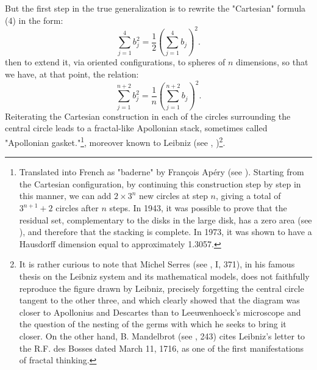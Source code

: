 \documentclass[12pt]{article}
\theoremstyle{définition}
\theoremstyle{remark}
\theoremstyle{plain}
\theoremstyle{plain}
\begin{document}
But the first step in the true generalization is to rewrite the "Cartesian" formula (4) in the form:
\[
\sum_{j=1}^4 b_j^2= \frac{1}{2}(\sum_{j=1}^4 b_j)^2.
\]
then to extend it, via oriented configurations, to spheres of $n$ dimensions, so that we have, at that point, the relation:
\[
\sum_{j=1}^{n+2} b_j^2= \frac{1}{n}(\sum_{j=1}^{n+2} b_j)^2. \]
Reiterating the Cartesian construction in each of the circles surrounding the central circle leads to a fractal-like Apollonian stack, sometimes called "Apollonian gasket."\footnote{Translated into French as "baderne" by François Apéry (see \cite{Ape}). Starting from the Cartesian configuration, by continuing this construction step by step in this manner, we can add $2 \times 3^n$ new circles at step $n$, giving a total of $3^{n+1}+2$ circles after $n$ steps. In 1943, it was possible to prove that the residual set, complementary to the disks in the large disk, has a zero area (see \cite{Kas}), and therefore that the stacking is complete. In 1973, it was shown to have a Hausdorff dimension equal to approximately 1.3057.}, moreover known to Leibniz (see \cite{Lei1}, \cite{Lei2})\footnote{It is rather curious to note that Michel Serres (see \cite{Ser}, I, 371), in his famous thesis on the Leibniz system and its mathematical models, does not faithfully reproduce the figure drawn by Leibniz, precisely forgetting the central circle tangent to the other three, and which clearly showed that the diagram was closer to Apollonius and Descartes than to Leeuwenhoeck's microscope and the question of the nesting of the germs with which he seeks to bring it closer. On the other hand, B. Mandelbrot (see \cite{Man}, 243) cites Leibniz's letter to the R.F. des Bosses dated March 11, 1716, as one of the first manifestations of fractal thinking.}.
\end{document}
